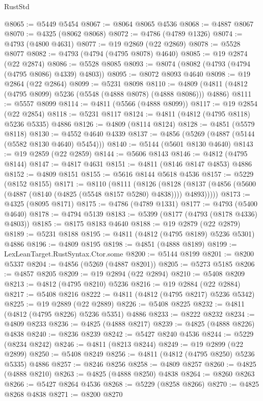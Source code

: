 \begin{lexlean}{RustStd}
\begin{coremodule}
{\begin{coremodule}
{{{{{{{{{{{{{{{{{{{{{{{{{{{{{{{{{{{{{{{{{{{{{{{{{{{{{{{{{{{{{{{{{{{{{{{{{{{{{{{{@8065 := @5449 @5454
@8067 := @8064 @8065 @4536
@8068 := @4887 @8067
@8070 := @4325 (@8062 @8068)
@8072 := @4786 (@4789 @1326)
@8074 := @4793 (@4800 @4631)
@8077 := @19 @2869 (@22 @2869)
@8078 := @5528 @8077
@8082 := @4793 (@4794 (@4795 @8078) @4640)
@8085 := @19 @2874 (@22 @2874)
@8086 := @5528 @8085
@8093 := @8074 (@8082 (@4793 (@4794 (@4795 @8086) @4339) @4803))
@8095 := @8072 @8093 @4640
@8098 := @19 @2864 (@22 @2864)
@8099 := @5231 @8098
@8110 := @4809 (@4811 (@4812 (@4795 @8099) @5236 (@5548 (@4888 @8078) (@4888 @8086))) @4886)
@8111 := @5557 @8099
@8114 := @4811 (@5566 (@4888 @8099))
@8117 := @19 @2854 (@22 @2854)
@8118 := @5231 @8117
@8124 := @4811 (@4812 (@4795 @8118) @5236 @5335) @4886
@8126 := @4809 (@8114 @8124)
@8128 := @4851 (@5579 @8118)
@8130 := @4552 @4640 @4339
@8137 := @4856 (@5269 (@4887 (@5144 (@5582 @8130 @4640) @5454)))
@8140 := @5144 (@5601 @8130 @4640)
@8143 := @19 @2859 (@22 @2859)
@8144 := @5606 @8143
@8146 := @4812 (@4795 @8144)
@8147 := @4817 @4631
@8151 := @4811 (@8146 @8147 @4853) @4886
@8152 := @4809 @8151
@8155 := @5616 @8144 @5618 @4536
@8157 := @5229 (@8152 @8155)
@8171 := @8110
    (@8111
      (@8126
        (@8128 (@8137 (@4856 (@5600 (@4887 (@8140 (@4825 (@5548 @8157 @5280) @4838)))) @4893)))))
@8173 := @4325 (@8095 @8171)
@8175 := @4786 (@4789 @1331)
@8177 := @4793 (@5400 @4640)
@8178 := @4794 @5139
@8183 := @5399 (@8177 (@4793 (@8178 @4336) @4803))
@8185 := @8175 @8183 @4640
@8188 := @19 @2879 (@22 @2879)
@8189 := @5231 @8188
@8195 := @4811 (@4812 (@4795 @8189) @5236 @5301) @4886
@8196 := @4809 @8195
@8198 := @4851 (@4888 @8189)
@8199 := LexLeanTarget.RustSyntax.Ctor.some
@8200 := @5144 @8199
@8201 := @8200 @5337
@8204 := @4856 (@5269 (@4887 @8201))
@8205 := @5273 @5185
@8206 := @4857 @8205
@8209 := @19 @2894 (@22 @2894)
@8210 := @5408 @8209
@8213 := @4812 (@4795 @8210) @5236
@8216 := @19 @2884 (@22 @2884)
@8217 := @5408 @8216
@8222 := @4811 (@4812 (@4795 @8217) @5236 @5342)
@8225 := @19 @2889 (@22 @2889)
@8226 := @5408 @8225
@8232 := @4811 (@4812 (@4795 @8226) @5236 @5351) @4886
@8233 := @8222 @8232
@8234 := @4809 @8233
@8236 := @4825 (@4888 @8217)
@8239 := @4825 (@4888 @8226) @4838
@8240 := @8236 @8239
@8242 := @5427 @8240 @4536
@8244 := @5229 (@8234 @8242)
@8246 := @4811 (@8213 @8244)
@8249 := @19 @2899 (@22 @2899)
@8250 := @5408 @8249
@8256 := @4811 (@4812 (@4795 @8250) @5236 @5335) @4886
@8257 := @8246 @8256
@8258 := @4809 @8257
@8260 := @4825 (@4888 @8210)
@8263 := @4825 (@4888 @8250) @4838
@8264 := @8260 @8263
@8266 := @5427 @8264 @4536
@8268 := @5229 (@8258 @8266)
@8270 := @4825 @8268 @4838
@8271 := @8200 @8270
}}}}}}}}}}}}}}}}}}}}}}}}}}}}}}}}}}}}}}}}}}}}}}}}}}}}}}}}}}}}}}}}}}}}}}}}}}}}}}}}
\end{coremodule}}
\end{coremodule}
\end{lexlean}
